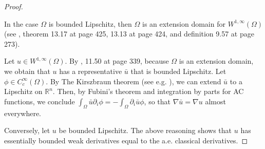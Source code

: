 \documentclass[english,a4paper,9pt,oneside]{scrbook}	%
\theoremstyle{break}
\newenvironment{mproof}[1][\proofname]{%
  \begin{proof}[#1]$ $\par\nobreak\ignorespaces
}{%
  \end{proof}
}
\renewcommand*{\proofname}{Proof}
\theoremstyle{remark}
\newcommand{\ds}{\displaystyle}
\newcommand{\cc}{\subset\subset}
\begin{document}
\begin{appendices}
\begin{mproof}
%
%
%
%

In the case $\Omega$ is bounded Lipschitz, then $\Omega$ is an extension domain for $W^{1,\infty}(\Omega)$ (see \cite{leoni}, theorem 13.17 at page 425, 13.13 at page 424, and definition 9.57 at page 273).

Let $u \in  W^{1,\infty}(\Omega)$. By \cite{leoni}, 11.50 at page 339, because $\Omega$ is an extension domain, we obtain that $u$ has a representative $\bar{u}$ that is bounded Lipschitz. Let $\phi \in C_c^\infty(\Omega)$. By The Kirszbraun theorem (see e.g. \cite{kirszbraun}), we can extend $\bar{u}$ to a Lipschitz on $\mathbb{R}^n$. Then, by Fubini's theorem and integration by parts for AC functions, we conclude $\ds \int_\Omega\bar{u}\partial_i\phi =-\int_{\Omega} \partial_i \bar{u} \phi $, so that $\nabla \bar{u} = \nabla u$ almost everywhere.

Conversely, let $u$ be bounded Lipschitz. The above reasoning shows that $u$ has essentially bounded weak derivatives equal to the a.e. classical derivatives.
\end{mproof}


\end{appendices}
\end{document}
